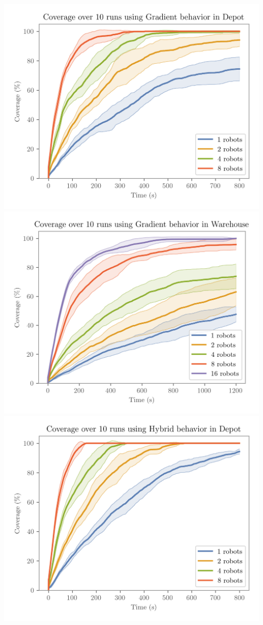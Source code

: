 \includegraphics[width=\w]{figures/plots/benchmarks/coverage-over-10-runs-using-gradient-behavior-in-depot.png}
\hfill
\includegraphics[width=\w]{figures/plots/benchmarks/coverage-over-10-runs-using-gradient-behavior-in-warehouse.png}
\\
\includegraphics[width=\w]{figures/plots/benchmarks/coverage-over-10-runs-using-hybrid-behavior-in-depot.png}
